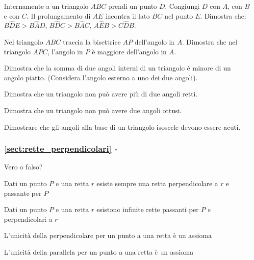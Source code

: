 \begin{esercizio}
\label{ese:3.4}
Internamente a un triangolo $ABC$ prendi un punto $D$. Congiungi $D$ con $A$, con $B$ e con $C$. Il prolungamento di $AE$ incontra il lato $BC$ nel punto $E$. Dimostra che: $B\widehat{D}E>B\widehat{A}D$, $B\widehat{D}C>B\widehat{A}C$, $A\widehat{E}B>C\widehat{D}B$.
\end{esercizio}

\begin{esercizio}
\label{ese:3.5}
Nel triangolo $ABC$ traccia la bisettrice $AP$ dell'angolo in $A$. Dimostra che nel triangolo $APC$, l'angolo in $P$ è maggiore dell'angolo in $A$.
\end{esercizio}

\begin{esercizio}
\label{ese:3.6}
Dimostra che la somma di due angoli interni di un triangolo è minore di un angolo piatto. (Considera l'angolo esterno a uno dei due angoli).
\end{esercizio}

\begin{esercizio}
\label{ese:3.7}
Dimostra che un triangolo non può avere più di due angoli retti.
\end{esercizio}

\begin{esercizio}
\label{ese:3.8}
Dimostra che un triangolo non può avere due angoli ottusi.
\end{esercizio}

\begin{esercizio}
\label{ese:3.9}
Dimostrare che gli angoli alla base di un triangolo isoscele devono essere acuti.
\end{esercizio}

\begingroup
\hypersetup{linkcolor=black}
\subsubsection*{\ref{sect:rette_perpendicolari} - }
\endgroup

\begin{esercizio}
\label{ese:3.10}
Vero o falso?
\begin{enumeratea}
\item Dati un punto $P$ e una retta $r$ esiste sempre una retta perpendicolare a $r$ e passante per $P$\tab\hfill\boxV\quad\boxF
\item Dati un punto $P$ e una retta $r$ esistono infinite rette passanti per $P$ e perpendicolari a $r$\tab\hfill\boxV\quad\boxF
\item L'unicità della perpendicolare per un punto a una retta è un assioma\hfill\boxV\quad\boxF
\item L'unicità della parallela per un punto a una retta è un assioma\hfill\boxV\quad\boxF
\end{enumeratea}
\end{esercizio}

